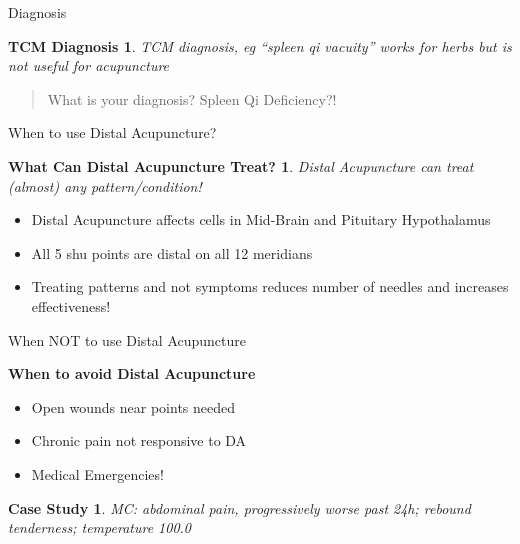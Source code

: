\begin{frame}{Diagnosis} %
  \newtheorem{t1.4}{TCM Diagnosis}
  \begin{t1.4}
    TCM diagnosis, eg ``spleen qi vacuity'' works for herbs but is not useful for acupuncture
  \end{t1.4}

  \vspace{1em}

  \begin{quote}
    What is your diagnosis? Spleen Qi Deficiency?!
  \end{quote}

\end{frame}

\begin{frame}{When to use Distal Acupuncture?} %
  \newtheorem{t1.5}{What Can Distal Acupuncture Treat?}
  \begin{t1.5}
    Distal Acupuncture can treat (almost) any pattern/condition!
  \end{t1.5}

  \begin{itemize}
  \item Distal Acupuncture affects cells in Mid-Brain and Pituitary Hypothalamus
  \item All 5 shu points are distal on all 12 meridians
  \item Treating patterns and not symptoms reduces number of needles and increases effectiveness!
  \end{itemize}

\end{frame}

\begin{frame}{When NOT to use Distal Acupuncture} %
  
  \textbf{\Large When to avoid Distal Acupuncture}
  \begin{itemize} \itemsep1.5em
  \item Open wounds near points needed
  \item Chronic pain not responsive to DA
  \item Medical Emergencies!
  \end{itemize}

  \newtheorem{t1.6}{Case Study}
  \begin{t1.6}
    MC: abdominal pain, progressively worse past 24h; rebound tenderness; temperature 100.0
  \end{t1.6}
  
\end{frame}

